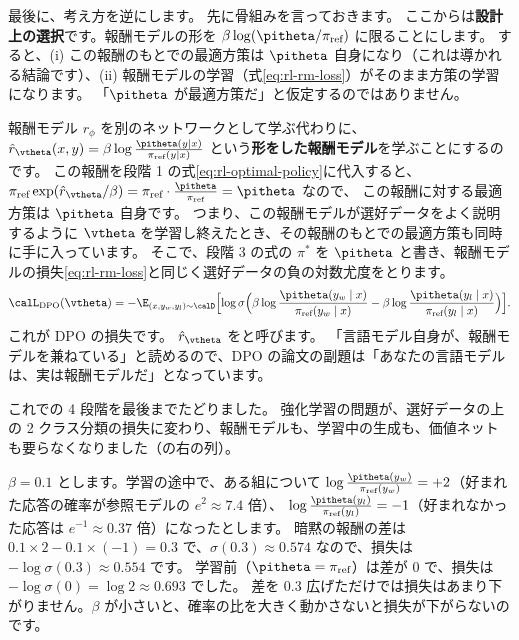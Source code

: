 最後に、考え方を逆にします。
先に骨組みを言っておきます。
ここからは\textbf{設計上の選択}です。報酬モデルの形を $\beta\log(\pitheta/\pi_{\text{ref}})$ に限ることにします。
すると、(i) この報酬のもとでの最適方策は $\pitheta$ 自身になり（これは導かれる結論です）、(ii) 報酬モデルの学習（式\eqref{eq:rl-rm-loss}）がそのまま方策の学習になります。
「$\pitheta$ が最適方策だ」と仮定するのではありません。

報酬モデル $r_\phi$ を別のネットワークとして学ぶ代わりに、
$\hat r_{\vtheta}(x,y)=\beta\log\frac{\pitheta(y\mid x)}{\pi_{\text{ref}}(y\mid x)}$ という\textbf{形をした報酬モデル}を学ぶことにするのです。
この報酬を段階 1 の式\eqref{eq:rl-optimal-policy}に代入すると、$\pi_{\text{ref}}\exp(\hat r_{\vtheta}/\beta)=\pi_{\text{ref}}\cdot\frac{\pitheta}{\pi_{\text{ref}}}=\pitheta$ なので、
この報酬に対する最適方策は $\pitheta$ 自身です。
つまり、この報酬モデルが選好データをよく説明するように $\vtheta$ を学習し終えたとき、その報酬のもとでの最適方策も同時に手に入っています。
そこで、段階 3 の式の $\pi^\ast$ を $\pitheta$ と書き、報酬モデルの損失\eqref{eq:rl-rm-loss}と同じく選好データの負の対数尤度をとります。
\begin{equation}
\calL_{\text{DPO}}(\vtheta)=-\E_{(x,y_w,y_l)\sim\calD}\Bigl[\log\sigma\Bigl(
\beta\log\frac{\pitheta(y_w\mid x)}{\pi_{\text{ref}}(y_w\mid x)}
-\beta\log\frac{\pitheta(y_l\mid x)}{\pi_{\text{ref}}(y_l\mid x)}\Bigr)\Bigr].
\label{eq:rl-dpo}
\end{equation}
これが DPO の損失です\cite{rafailov2023direct}。
$\hat r_{\vtheta}$ をと呼びます。
「言語モデル自身が、報酬モデルを兼ねている」と読めるので、DPO の論文の副題は「あなたの言語モデルは、実は報酬モデルだ」となっています。

これでの 4 段階を最後までたどりました。
強化学習の問題が、選好データの上の 2 クラス分類の損失に変わり、報酬モデルも、学習中の生成も、価値ネットも要らなくなりました（の右の列）。

\begin{example}
$\beta=0.1$ とします。学習の途中で、ある組について
$\log\frac{\pitheta(y_w)}{\pi_{\text{ref}}(y_w)}=+2$（好まれた応答の確率が参照モデルの $e^2\approx7.4$ 倍）、
$\log\frac{\pitheta(y_l)}{\pi_{\text{ref}}(y_l)}=-1$（好まれなかった応答は $e^{-1}\approx0.37$ 倍）になったとします。
暗黙の報酬の差は $0.1\times2-0.1\times(-1)=0.3$ で、$\sigma(0.3)\approx0.574$ なので、損失は $-\log\sigma(0.3)\approx0.554$ です。
学習前（$\pitheta=\pi_{\text{ref}}$）は差が 0 で、損失は $-\log\sigma(0)=\log2\approx0.693$ でした。
差を 0.3 広げただけでは損失はあまり下がりません。$\beta$ が小さいと、確率の比を大きく動かさないと損失が下がらないのです。
\end{example}

